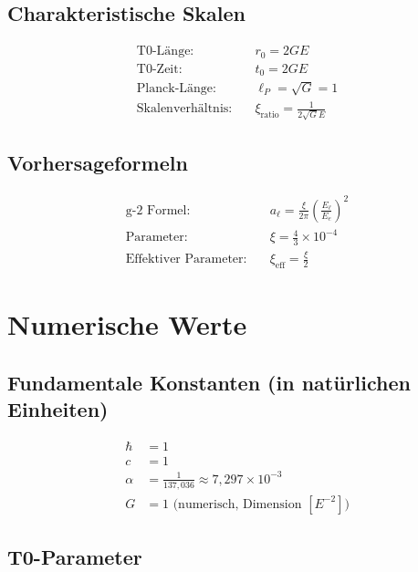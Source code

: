 	\subsection{Charakteristische Skalen}
	
	\begin{align}
		\text{T0-Länge:} \quad & r_0 = 2GE \\
		\text{T0-Zeit:} \quad & t_0 = 2GE \\
		\text{Planck-Länge:} \quad & \ell_P = \sqrt{G} = 1 \\
		\text{Skalenverhältnis:} \quad & \xi_{\text{ratio}} = \frac{1}{2\sqrt{G} E}
	\end{align}
	
	\subsection{Vorhersageformeln}
	
	\begin{align}
		\text{g-2 Formel:} \quad & a_\ell = \frac{\xi}{2\pi} \left(\frac{E_\ell}{E_e}\right)^2 \\
		\text{Parameter:} \quad & \xi = \frac{4}{3} \times 10^{-4} \\
		\text{Effektiver Parameter:} \quad & \xi_{\text{eff}} = \frac{\xi}{2}
	\end{align}
	
	\section{Numerische Werte}
	\label{sec:numerical_values}
	
	\subsection{Fundamentale Konstanten (in natürlichen Einheiten)}
	
	\begin{align}
		\hbar &= 1 \\
		c &= 1 \\
		\alpha &= \frac{1}{137{,}036} \approx 7{,}297 \times 10^{-3} \\
		G &= 1 \text{ (numerisch, Dimension } [E^{-2}]\text{)}
	\end{align}
	
	\subsection{T0-Parameter}
	
